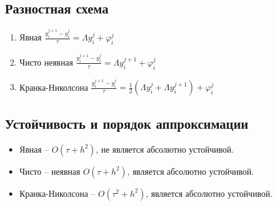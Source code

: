 \documentclass{article}
\begin{document}
\subsection*{Разностная схема}
\begin{enumerate}
    \item Явная $\frac{y_i^{j+1}-y_i^j}{\tau} = \Lambda y_i^j + \varphi_i^j$
    \item Чисто неявная $\frac{y_i^{j+1}-y_i^j}{\tau} =  \Lambda y_i^{j+1}+\varphi_i^j$
    \item Кранка-Николсона $\frac{y_i^{j+1}-y_i^j}{\tau} = \frac{1}{2}(\Lambda y_i^j + \Lambda y_i^{j+1})+\varphi_i^j$
\end{enumerate}

\subsection*{Устойчивость и порядок аппроксимации}
\begin{itemize}
    \item Явная -- $O(\tau + h^2)$, не является абсолютно устойчивой.
    \item Чисто -- неявная $O(\tau + h^2)$, является абсолютно устойчивой.
    \item Кранка-Николсона -- $O(\tau^2 + h^2)$, является абсолютно устойчивой.
\end{itemize}
\end{document}
